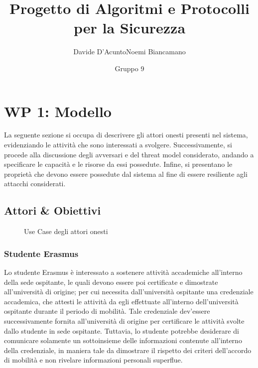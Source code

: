 \documentclass[a4paper,12pt]{article}
\title{Progetto di Algoritmi e Protocolli per la Sicurezza}
\author{Davide D'Acunto\quad Noemi Biancamano}
\date{Gruppo 9}
\begin{document}
\maketitle

\tableofcontents

\section{WP 1: Modello}
La seguente sezione si occupa di descrivere gli attori onesti presenti nel sistema, evidenziando le attività che sono interessati a svolgere.
\newline Successivamente, si procede alla discussione degli avversari e del threat model considerato, andando a specificare le capacità e le risorse da essi possedute. Infine, si presentano le proprietà che devono essere possedute dal sistema al fine di essere resiliente agli attacchi considerati.
\subsection{Attori \& Obiettivi}

\begin{figure}[H]
    \centering
    
    \caption{Use Case degli attori onesti}
    \label{fig:usecase1}
\end{figure}

\subsubsection{Studente Erasmus}
Lo studente Erasmus è interessato a sostenere attività accademiche all'interno della sede ospitante, le quali devono essere poi certificate e dimostrate all'università di origine; per cui necessita dall'università ospitante una credenziale accademica, che attesti le attività da egli effettuate all'interno dell'università ospitante durante il periodo di mobilità. 
\newline Tale credenziale dev'essere successivamente fornita all'università di origine per certificare le attività svolte dallo studente in sede ospitante. Tuttavia, lo studente potrebbe desiderare di comunicare solamente un sottoinsieme delle informazioni contenute all'interno della credenziale, in maniera tale da dimostrare il rispetto dei criteri dell'accordo di mobilità e non rivelare informazioni personali superflue.
\end{document}
